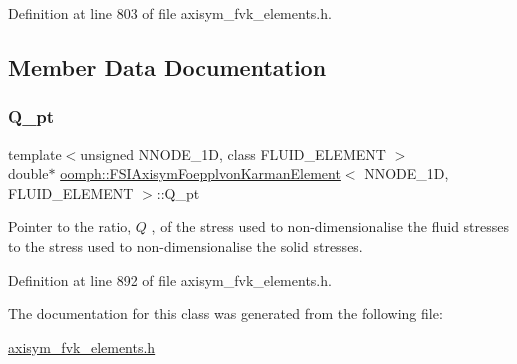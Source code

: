 Definition at line 803 of file axisym\+\_\+fvk\+\_\+elements.\+h.



\subsection{Member Data Documentation}
\mbox{\label{classoomph_1_1FSIAxisymFoepplvonKarmanElement_a5a46530d8ee9c6d2a478818e90c4a65e}} 
\subsubsection{\texorpdfstring{Q\+\_\+pt}{Q\_pt}}
{\footnotesize\ttfamily template$<$unsigned N\+N\+O\+D\+E\+\_\+1D, class F\+L\+U\+I\+D\+\_\+\+E\+L\+E\+M\+E\+NT $>$ \\
double$\ast$ \hyperlink{classoomph_1_1FSIAxisymFoepplvonKarmanElement}{oomph\+::\+F\+S\+I\+Axisym\+Foepplvon\+Karman\+Element}$<$ N\+N\+O\+D\+E\+\_\+1D, F\+L\+U\+I\+D\+\_\+\+E\+L\+E\+M\+E\+NT $>$\+::Q\+\_\+pt\hspace{0.3cm}{\ttfamily [protected]}}



Pointer to the ratio, $ Q $ , of the stress used to non-\/dimensionalise the fluid stresses to the stress used to non-\/dimensionalise the solid stresses. 



Definition at line 892 of file axisym\+\_\+fvk\+\_\+elements.\+h.



The documentation for this class was generated from the following file\+:\begin{DoxyCompactItemize}
\item 
\hyperlink{axisym__fvk__elements_8h}{axisym\+\_\+fvk\+\_\+elements.\+h}\end{DoxyCompactItemize}
